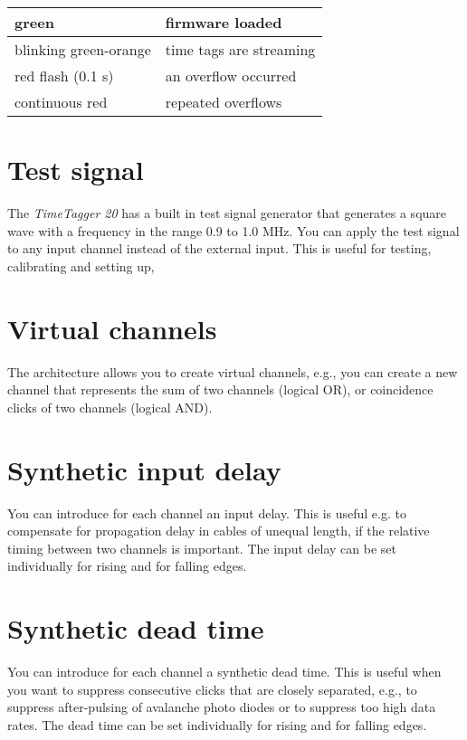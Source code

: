 \documentclass[letterpaper,10pt,english]{sphinxmanual}
\begin{document}
\noindent\begin{tabulary}{\linewidth}{|L|L|}
\hline

green
&
firmware loaded
\\
\hline
blinking green-orange
&
time tags are streaming
\\
\hline
red flash (0.1 s)
&
an overflow occurred
\\
\hline
continuous red
&
repeated overflows
\\
\hline\end{tabulary}



\section{Test signal}
\label{sections/hardware:test-signal}
The \emph{TimeTagger 20} has a built in test signal generator that
generates a square wave with a frequency in the range 0.9 to 1.0 MHz.
You can apply the test signal to any input channel instead of the
external input. This is useful for testing, calibrating and setting up,


\section{Virtual channels}
\label{sections/hardware:virtual-channels}
The architecture allows you to create virtual channels, e.g.,
you can create a new channel that represents the sum of two channels (logical OR),
or coincidence clicks of two channels (logical AND).


\section{Synthetic input delay}
\label{sections/hardware:synthetic-input-delay}
You can introduce for each channel an input delay. This is useful
e.g. to compensate for propagation delay in cables of unequal length,
if the relative timing between two channels is important. The input delay
can be set individually for rising and for falling edges.


\section{Synthetic dead time}
\label{sections/hardware:synthetic-dead-time}
You can introduce for each channel a synthetic dead time. This is useful
when you want to suppress consecutive clicks that are closely separated,
e.g., to suppress after-pulsing of avalanche photo diodes or to suppress too
high data rates. The dead time can be set individually for rising and for falling edges.
\end{document}
